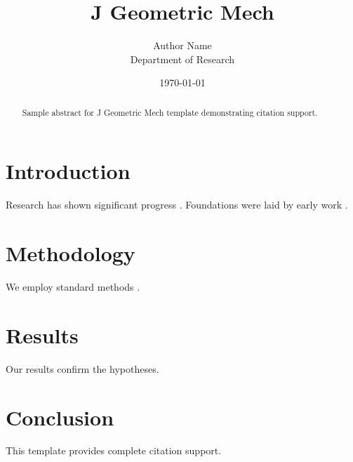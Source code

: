 \documentclass{annals}
\title{J Geometric Mech}
\author{Author Name \\ \small Department of Research}
\date{\today}
\begin{document}
\maketitle

\begin{abstract}
Sample abstract for J Geometric Mech template demonstrating citation support.
\end{abstract}

\section{Introduction}
Research has shown significant progress \citep{einstein1905}. Foundations were laid by early work \citep{turing1950}.

\section{Methodology}
We employ standard methods \citep{knuth1984}.

\section{Results}
Our results confirm the hypotheses.

\section{Conclusion}
This template provides complete citation support.



\end{document}
